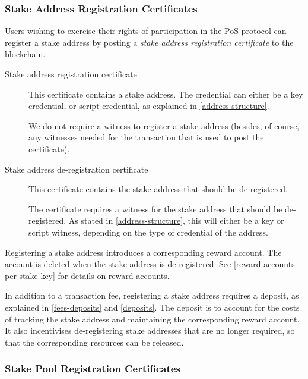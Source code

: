 \documentclass[11pt,a4paper,dvipsnames,twosided]{article}
\begin{document}
\subsubsection{Stake Address Registration Certificates}
\label{stake-address-registration-certificates}

Users wishing to exercise their rights of participation in the PoS protocol can
register a stake address by posting a \emph{stake address registration
  certificate} to the blockchain.

\begin{description}
\item[Stake address registration certificate] This certificate contains a stake
  address. The credential can either be a key credential, or script credential,
  as explained in \cref{address-structure}.

  We do not require a witness to register a stake address (besides, of course,
  any witnesses needed for the transaction that is used to post the
  certificate).

\item[Stake address de-registration certificate]
This certificate contains the stake address that should be de-registered.

The certificate requires a witness for the stake address that should be
de-registered. As stated in \cref{address-structure}, this will either be a key
or script witness, depending on the type of credential of the address.

\end{description}

Registering a stake address introduces a corresponding reward account.
The account is deleted when the stake address is de-registered. See
\cref{reward-accounts-per-stake-key} for details on reward accounts.

In addition to a transaction fee, registering a stake address requires a
deposit, as explained in \cref{fees-deposits} and \cref{deposits}. The deposit
is to account for the costs of tracking the stake address and maintaining the
corresponding reward account. It also incentivises de-registering stake
addresses that are no longer required, so that the corresponding resources can
be released.

\subsubsection{Stake Pool Registration Certificates}
\label{stake-pool-registration-certificates}
\end{document}
